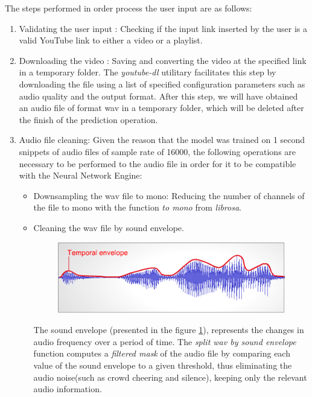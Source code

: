 The steps performed in order process the user input are as follows:
\begin{enumerate}

	\item Validating the user input : Checking if the input link inserted by the user is a valid YouTube link to
	either a video or a playlist.
	\item Downloading the video : Saving and converting the video at the specified link in a temporary folder.
		The \textit{youtube-dl} utilitary facilitates this step by downloading the file using
	a list of specified configuration parameters such as audio quality and the output format. After this step,
	we will have obtained an audio file of format wav in a temporary folder, which will be deleted after
	the finish of the prediction operation.
	\item Audio file cleaning: Given the reason that the model was trained on 1 second snippets of audio files of sample rate of 16000,
		the following operations are necessary to be performed to the audio file in order for it to be compatible with the Neural Network Engine:
		\begin{itemize}
			\item Downsampling the wav file to mono: Reducing the number of channels of the file to
			mono with the function \textit{to mono} from \textit{librosa}.
			\item Cleaning the wav file by sound envelope.
			\begin{figure}[H]
				\centering
				\includegraphics{images/soundenvelope.png}
				\centerline{}
			\label{se}
			\end{figure}

	The sound envelope (presented in the figure \ref{se}), represents the changes in audio frequency over a period
	of time. The \textit{split wav by sound envelope} function computes a \textit{filtered mask} of the audio file
	by comparing each value of the sound envelope to a given threshold, thus eliminating the audio noise(such as
	crowd cheering and silence), keeping only the relevant audio information.


\end{itemize}
\end{enumerate}
